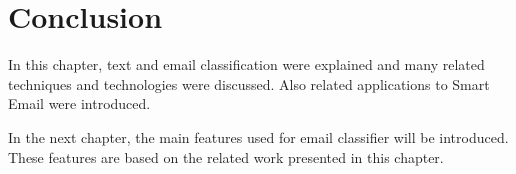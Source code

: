 \section{Conclusion}
In this chapter, text and email classification were explained and many related techniques and technologies were discussed. Also related applications to Smart Email were introduced.

In the next chapter, the main features used for email classifier will be introduced. These features are based on the related work presented in this chapter.
